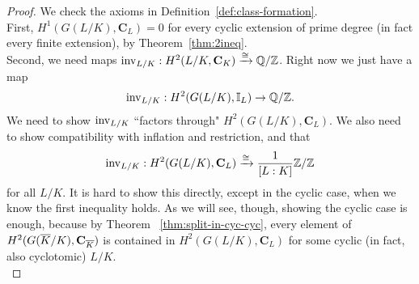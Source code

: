 \begin{proof}
We check the axioms in Definition~\ref{def:class-formation}.\\

First, $H^1(G(L/K),\mathbf C_L)=0$ for every cyclic extension of prime degree (in fact every finite extension), by Theorem~\ref{thm:2ineq}.\\

Second, we need maps $\operatorname{inv}_{L/K}:H^2(L/K,\mathbf C_K)\xrightarrow{\cong} \mathbb{Q}/\mathbb{Z}$. 
Right now we just have a map
\[
\operatorname{inv}_{L/K}:H^2(G(L/K),\mathbb{I}_L)\to \mathbb{Q}/\mathbb{Z}.
\]
We need to show $\operatorname{inv}_{L/K}$ ``factors through" $H^2(G(L/K),\mathbf C_L)$. We also need to show compatibility with inflation and restriction, and that 
\[
\operatorname{inv}_{L/K}:H^2(G(L/K),\mathbf C_L)\xrightarrow{\cong} \frac{1}{[L:K]}\mathbb{Z}/\mathbb{Z}
\]
for all $L/K$. It is hard to show this directly, except in the cyclic case, when we know the first inequality holds. As we will see, though, showing the cyclic case is enough, because by Theorem	~\ref{thm:split-in-cyc-cyc}, every element of $H^2(G(\overline{K}/K),\mathbf C_{\overline{K}})$ is contained in  $H^2(G(L/K),\mathbf C_L)$ for some cyclic (in fact, also cyclotomic) $L/K$.\\


\end{proof}
